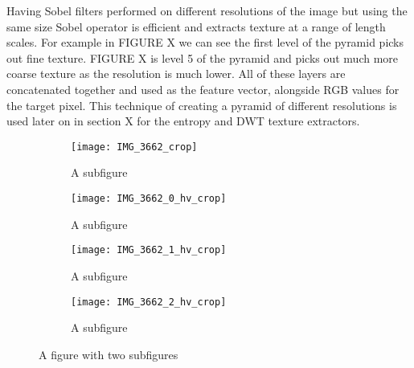 \documentclass[12pt]{IIBproject}
\begin{document}
 Having Sobel filters performed on different resolutions of the image but using the same size Sobel operator is efficient and extracts texture at a range of length scales. For example in FIGURE X we can see the first level of the pyramid picks out fine texture. FIGURE X is level 5 of the pyramid and picks out much more coarse texture as the resolution is much lower. All of these layers are concatenated together and used as the feature vector, alongside RGB values for the target pixel. This technique of creating a pyramid of different resolutions is used later on in section X for the entropy and DWT texture extractors.
 \begin{figure}[H]
\centering
\begin{subfigure}{.45\textwidth}
  \centering
  \texttt{[image: IMG\_3662\_crop]}
  \caption{A subfigure}
  \label{fig:sub1}
\end{subfigure}%
\begin{subfigure}{.45\textwidth}
  \centering
  \texttt{[image: IMG\_3662\_0\_hv\_crop]}
  \caption{A subfigure}
  \label{fig:sub2}
\end{subfigure}
\begin{subfigure}{.45\textwidth}
  \centering
  \texttt{[image: IMG\_3662\_1\_hv\_crop]}
  \caption{A subfigure}
  \label{fig:sub2}
\end{subfigure}
\begin{subfigure}{.45\textwidth}
  \centering
  \texttt{[image: IMG\_3662\_2\_hv\_crop]}
  \caption{A subfigure}
  \label{fig:sub2}
\end{subfigure}
\caption{A figure with two subfigures}
\label{fig:test}
\end{figure}
\end{document}

